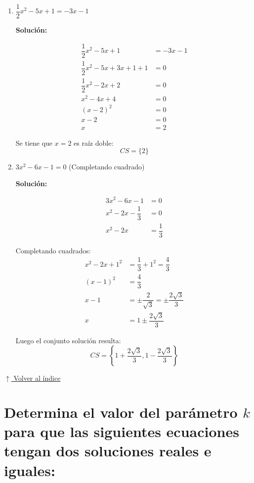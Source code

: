 \documentclass[12pt]{article}
\newcommand{\solucion}{%
    \vspace{0.8em}%
    \textbf{Solución:}%
}
\newcommand{\volverindice}{%
    \vspace{1em}%
    \begin{flushright}%
        \hyperlink{indice}{\small $\uparrow$ Volver al índice}%
    \end{flushright}%
}
\begin{document}
\begin{enumerate}[label=\alph*.-]
Luego:
\[
\boxed{CS = \left\{-\dfrac{1}{4} + \dfrac{\sqrt{7}}{4}i, -\dfrac{1}{4} - \dfrac{\sqrt{7}}{4}i\right\}}
\]

\item $\dfrac{1}{2}x^2 - 5x + 1 = -3x - 1$

\solucion
\begin{align*}
\dfrac{1}{2}x^2 - 5x + 1 &= -3x - 1 \\[0.3em]
\dfrac{1}{2}x^2 - 5x + 3x + 1 + 1 &= 0 \\[0.3em]
\dfrac{1}{2}x^2 - 2x + 2 &= 0 \\[0.3em]
x^2 - 4x + 4 &= 0 \\[0.3em]
(x - 2)^2 &= 0 \\[0.3em]
x - 2 &= 0 \\[0.3em]
x &= 2
\end{align*}

Se tiene que $x = 2$ es raíz doble:
\[
\boxed{CS = \{2\}}
\]

\item $3x^2 - 6x - 1 = 0$ \quad (Completando cuadrado)

\solucion
\begin{align*}
3x^2 - 6x - 1 &= 0 \\[0.3em]
x^2 - 2x - \dfrac{1}{3} &= 0 \\[0.3em]
x^2 - 2x &= \dfrac{1}{3}
\end{align*}

Completando cuadrados:
\begin{align*}
x^2 - 2x + 1^2 &= \dfrac{1}{3} + 1^2 = \dfrac{4}{3} \\[0.3em]
(x - 1)^2 &= \dfrac{4}{3} \\[0.3em]
x - 1 &= \pm \dfrac{2}{\sqrt{3}} = \pm \dfrac{2\sqrt{3}}{3} \\[0.3em]
x &= 1 \pm \dfrac{2\sqrt{3}}{3}
\end{align*}

Luego el conjunto solución resulta:
\[
\boxed{CS = \left\{1 + \dfrac{2\sqrt{3}}{3}, 1 - \dfrac{2\sqrt{3}}{3}\right\}}
\]
\end{enumerate}

\volverindice
\newpage

\section[Parámetro k en ecuaciones cuadráticas]{Determina el valor del parámetro $k$ para que las siguientes ecuaciones tengan dos soluciones reales e iguales:}
\end{document}
